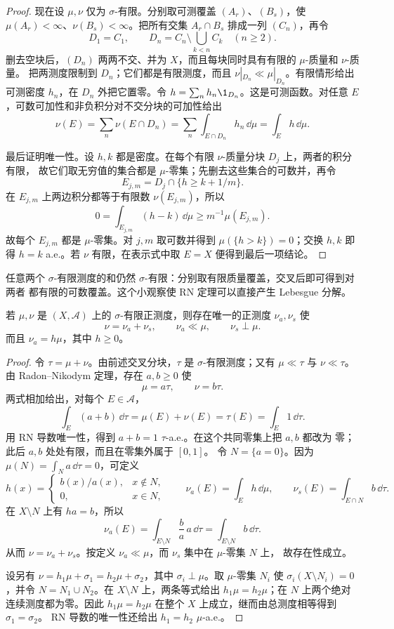 \begin{proof}
现在设 $\mu,\nu$ 仅为 $\sigma$-有限。分别取可测覆盖 $(A_r)$、$(B_s)$，使
$\mu(A_r)<\infty$、$\nu(B_s)<\infty$。把所有交集 $A_r\cap B_s$ 排成一列 $(C_n)$，再令
\[
 D_1=C_1,
 \qquad D_n=C_n\setminus\bigcup_{k<n}C_k\quad(n\ge2).
\]
删去空块后，$(D_n)$ 两两不交、并为 $X$，而且每块同时具有有限的 $\mu$-质量和 $\nu$-质量。
把两测度限制到 $D_n$；它们都是有限测度，而且
$\nu|_{D_n}\ll\mu|_{D_n}$。有限情形给出可测密度 $h_n$，在 $D_n$ 外把它置零。令
$h=\sum_nh_n\1_{D_n}$。这是可测函数。对任意 $E$，可数可加性和非负积分对不交分块的可加性给出
\[
 \nu(E)=\sum_n\nu(E\cap D_n)
 =\sum_n\int_{E\cap D_n}h_n\,\dd\mu
 =\int_Eh\,\dd\mu.
\]

最后证明唯一性。设 $h,k$ 都是密度。在每个有限 $\nu$-质量分块 $D_j$ 上，两者的积分有限，
故它们取无穷值的集合都是 $\mu$-零集；先删去这些集合的可数并，再令
\[
 E_{j,m}=D_j\cap\{h\ge k+1/m\}.
\]
在 $E_{j,m}$ 上两边积分都等于有限数 $\nu(E_{j,m})$，所以
\[
 0=\int_{E_{j,m}}(h-k)\,\dd\mu\ge m^{-1}\mu(E_{j,m}).
\]
故每个 $E_{j,m}$ 都是 $\mu$-零集。对 $j,m$ 取可数并得到
$\mu(\{h>k\})=0$；交换 $h,k$ 即得 $h=k$ a.e.。若 $\nu$ 有限，在表示式中取 $E=X$
便得到最后一项结论。
\end{proof}

任意两个 $\sigma$-有限测度的和仍然 $\sigma$-有限：分别取有限质量覆盖，交叉后即可得到对两者
都有限的可数覆盖。这个小观察使 RN 定理可以直接产生 Lebesgue 分解。

\begin{theorem}\label{theorem:3-3-1-2}
若 $\mu,\nu$ 是 $(X,\mathcal A)$ 上的 $\sigma$-有限正测度，则存在唯一的正测度
$\nu_a,\nu_s$ 使
\[
  \nu=\nu_a+\nu_s,
  \qquad \nu_a\ll\mu,
  \qquad \nu_s\perp\mu.
\]
而且 $\nu_a=h\mu$，其中 $h\ge0$。
\end{theorem}

\begin{proof}
令 $\tau=\mu+\nu$。由前述交叉分块，$\tau$ 是 $\sigma$-有限测度；又有
$\mu\ll\tau$ 与 $\nu\ll\tau$。由 Radon--Nikodym 定理，存在 $a,b\ge0$ 使
\[
  \mu=a\tau,
  \qquad \nu=b\tau.
\]
两式相加给出，对每个 $E\in\mathcal A$，
\[
 \int_E(a+b)\,\dd\tau=\mu(E)+\nu(E)=\tau(E)=\int_E1\,\dd\tau.
\]
用 RN 导数唯一性，得到 $a+b=1$ $\tau$-a.e.。在这个共同零集上把 $a,b$ 都改为
零；此后 $a,b$ 处处有限，而且在零集外属于 $[0,1]$。
令 $N=\{a=0\}$。因为 $\mu(N)=\int_Na\,\dd\tau=0$，可定义
\[
  h(x)=
  \begin{cases}
    b(x)/a(x),&x\notin N,\\
    0,&x\in N,
  \end{cases}
  \qquad
  \nu_a(E)=\int_Eh\,\dd\mu,
  \qquad
  \nu_s(E)=\int_{E\cap N}b\,\dd\tau.
\]
在 $X\setminus N$ 上有 $ha=b$，所以
\[
 \nu_a(E)=\int_{E\setminus N}\frac ba\,a\,\dd\tau
 =\int_{E\setminus N}b\,\dd\tau.
\]
从而 $\nu=\nu_a+\nu_s$。按定义 $\nu_a\ll\mu$，而 $\nu_s$ 集中在 $\mu$-零集 $N$ 上，
故存在性成立。

设另有 $\nu=h_1\mu+\sigma_1=h_2\mu+\sigma_2$，其中 $\sigma_i\perp\mu$。取
$\mu$-零集 $N_i$ 使 $\sigma_i(X\setminus N_i)=0$，并令 $N=N_1\cup N_2$。在 $X\setminus N$
上，两条等式给出 $h_1\mu=h_2\mu$；在 $N$ 上两个绝对连续测度都为零。因此
$h_1\mu=h_2\mu$ 在整个 $X$ 上成立，继而由总测度相等得到 $\sigma_1=\sigma_2$。
RN 导数的唯一性还给出 $h_1=h_2$ $\mu$-a.e.。
\end{proof}

